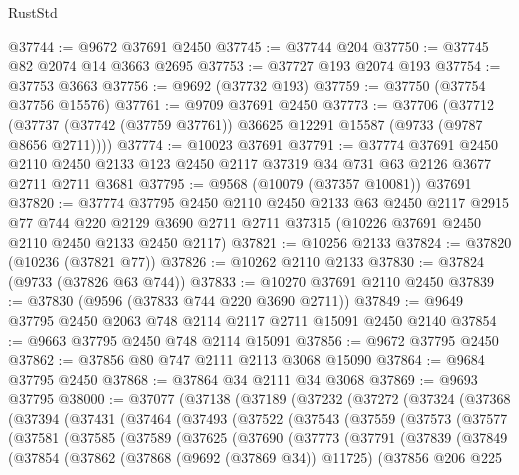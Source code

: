 \begin{lexlean}{RustStd}
\begin{coremodule}
{\begin{coremodule}
{{{{{{{{{{{{{{{{{{{{{{{{{{{{{{{{{{{{{{{{{{{{{{{{{{{{{{{@37744 := @9672 @37691 @2450
@37745 := @37744 @204
@37750 := @37745 @82 @2074 @14 @3663 @2695
@37753 := @37727 @193 @2074 @193
@37754 := @37753 @3663
@37756 := @9692 (@37732 @193)
@37759 := @37750 (@37754 @37756 @15576)
@37761 := @9709 @37691 @2450
@37773 := @37706
    (@37712 (@37737 (@37742 (@37759 @37761)) @36625 @12291 @15587 (@9733 (@9787 @8656 @2711))))
@37774 := @10023 @37691
@37791 := @37774
    @37691
    @2450
    @2110
    @2450
    @2133
    @123
    @2450
    @2117
    @37319
    @34
    @731
    @63
    @2126
    @3677
    @2711
    @2711
    @3681
@37795 := @9568 (@10079 (@37357 @10081)) @37691
@37820 := @37774
    @37795
    @2450
    @2110
    @2450
    @2133
    @63
    @2450
    @2117
    @2915
    @77
    @744
    @220
    @2129
    @3690
    @2711
    @2711
    @37315
    (@10226 @37691 @2450 @2110 @2450 @2133 @2450 @2117)
@37821 := @10256 @2133
@37824 := @37820 (@10236 (@37821 @77))
@37826 := @10262 @2110 @2133
@37830 := @37824 (@9733 (@37826 @63 @744))
@37833 := @10270 @37691 @2110 @2450
@37839 := @37830 (@9596 (@37833 @744 @220 @3690 @2711))
@37849 := @9649 @37795 @2450 @2063 @748 @2114 @2117 @2711 @15091 @2450 @2140
@37854 := @9663 @37795 @2450 @748 @2114 @15091
@37856 := @9672 @37795 @2450
@37862 := @37856 @80 @747 @2111 @2113 @3068 @15090
@37864 := @9684 @37795 @2450
@37868 := @37864 @34 @2111 @34 @3068
@37869 := @9693 @37795
@38000 := @37077
    (@37138
      (@37189
        (@37232
          (@37272
            (@37324
              (@37368
                (@37394
                  (@37431
                    (@37464
                      (@37493
                        (@37522
                          (@37543
                            (@37559
                              (@37573
                                (@37577
                                  (@37581
                                    (@37585
                                      (@37589
                                        (@37625
                                          (@37690
                                            (@37773
                                              (@37791
                                                (@37839
                                                  (@37849
                                                    (@37854
                                                      (@37862
                                                        (@37868 (@9692 (@37869 @34)) @11725)
                                                        (@37856
                                                          @206
                                                          @225
}}}}}}}}}}}}}}}}}}}}}}}}}}}}}}}}}}}}}}}}}}}}}}}}}}}}}}}
\end{coremodule}}
\end{coremodule}
\end{lexlean}
